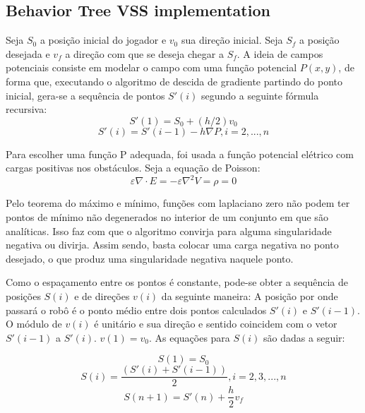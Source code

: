 \documentclass[a4paper,12pt]{article}
\begin{document}
\subsection{Behavior Tree VSS implementation}

Seja $S_{0}$ a posição inicial do jogador e $v_{0}$ sua direção inicial. Seja $S_{f}$ a posição desejada e $v_{f}$ a direção com que se deseja chegar a $S_{f}$. A ideia de campos potenciais consiste em modelar o campo com uma função potencial $P(x,y)$, de forma que, executando o algoritmo de descida de gradiente partindo do ponto inicial, gera-se a sequência de pontos $S'(i)$ segundo a seguinte fórmula recursiva:
\begin{equation}
S'(1) = S_{0} + (h/2)v_{0}
\end{equation}
\begin{equation}
S'(i) = S'(i-1) - h\nabla P, i = 2,...,n
\end{equation}

Para escolher uma função P adequada, foi usada a função potencial elétrico com cargas positivas nos obstáculos. Seja a equação de Poisson:
\begin{equation}
\varepsilon \nabla \cdot E = -\varepsilon \nabla ^2 V=\rho = 0
\end{equation}

Pelo teorema do máximo e mínimo, funções com laplaciano zero não podem ter pontos de mínimo não degenerados no interior de um conjunto em que são analíticas. Isso faz com que o algoritmo convirja para alguma singularidade negativa ou divirja. Assim sendo, basta colocar uma carga negativa no ponto desejado, o que produz uma singularidade negativa naquele ponto.

Como o espaçamento entre os pontos é constante, pode-se obter a sequência de posições $S(i)$ e de direções $v(i)$ da seguinte maneira: A posição por onde passará o robô é o ponto médio entre dois pontos calculados $S'(i)$ e $S'(i-1)$. O módulo de $v(i)$ é unitário e sua direção e sentido coincidem com o vetor $S'(i-1)$ a $S'(i)$. $v(1) = v_{0}$. As equações para $S(i)$ são dadas a seguir:

\begin{equation}
	S(1) = S_{0}
\end{equation}
\begin{equation}
	S(i) = \frac{(S'(i)+S'(i-1))}{2}, i = 2,3,...,n
\end{equation}
\begin{equation}
	S(n+1) = S'(n) + \frac{h}{2} v_{f}
\end{equation}
\end{document}

